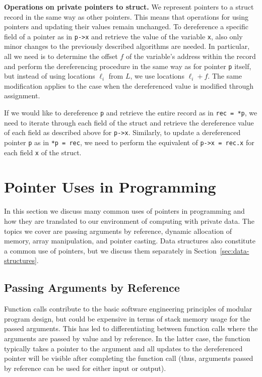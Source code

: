 \documentclass[11pt]{article}
\begin{document}
\medskip \noindent \textbf{Operations on private pointers to struct.} We
represent pointers to a struct record in the same way as other pointers.
This means that operations for using pointers and updating their values
remain unchanged. To dereference a specific field of a pointer as in
\texttt{p->x} and retrieve the value of the variable \texttt{x}, also only
minor changes to the previously described algorithms are needed. In
particular, all we need is to determine the offset $f$ of the variable's
address within the record and perform the dereferencing procedure in the
same way as for pointer \texttt{p} itself, but instead of using locations
$\ell_i$ from $L$, we use locations $\ell_i + f$. The same modification
applies to the case when the dereferenced value is modified through
assignment. 

If we would like to dereference \texttt{p} and retrieve the entire record as
in \texttt{rec = *p}, we need to iterate through each field of the struct
and retrieve the dereference value of each field as described above for
\texttt{p->x}. Similarly, to update a dereferenced pointer \texttt{p} as in 
\texttt{*p = rec}, we need to perform the equivalent of \texttt{p->x =
rec.x} for each field \texttt{x} of the struct.

\section{Pointer Uses in Programming} \label{sec:pointer-uses} 

In this section we discuss many common uses of pointers in programming and
how they are translated to our environment of computing with private data.
The topics we cover are passing arguments by reference, dynamic allocation
of memory, array manipulation, and pointer casting. Data structures also
constitute a common use of pointers, but we discuss them separately in
Section~\ref{sec:data-structures}.

\subsection{Passing Arguments by Reference}

Function calls contribute to the basic software engineering principles of
modular program design, but could be expensive in terms of stack memory
usage for the passed arguments. This has led to differentiating between
function calls where the arguments are passed by value and by reference. In
the latter case, the function typically takes a pointer to the argument and
all updates to the dereferenced pointer will be visible after completing the
function call (thus, arguments passed by reference can be used for either
input or output).
\end{document}
